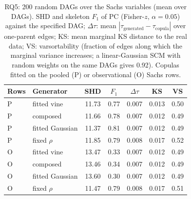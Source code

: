 \documentclass[
  english,
  class=report,
  accentcolor=2c,
  marginpar=false,
  parskip=half-,
  fontsize=11pt,
  ruledheaders=false,
  pdfa=false,
  IMRAD=false,
  thesis={type=master}
]{tudapub}
\begin{document}
\begin{table}[ht]
\caption{RQ5: 200 random DAGs over the Sachs variables (mean over DAGs). SHD and skeleton $F_1$ of PC (Fisher-$z$, $\alpha=0.05$) against the specified DAG; $\Delta\tau$: mean $|\tau_{\text{generated}} - \tau_{\text{copula}}|$ over one-parent edges; KS: mean marginal KS distance to the real data; VS: varsortability (fraction of edges along which the marginal variance increases; a linear-Gaussian SCM with random weights on the same DAGs gives 0.92). Copulas fitted on the pooled (P) or observational (O) Sachs rows.}
\label{tab:novel}
\centering
\small
\begin{tabular}{llccccc}
\toprule
\textbf{Rows} & \textbf{Generator} & \textbf{SHD} & \textbf{$F_1$} & \textbf{$\Delta\tau$} & \textbf{KS} & \textbf{VS} \\
\midrule
P & fitted vine      & 11.73 & 0.77 & 0.007 & 0.013 & 0.50 \\
P & composed         & 11.66 & 0.78 & 0.007 & 0.012 & 0.49 \\
P & fitted Gaussian  & 11.37 & 0.81 & 0.007 & 0.012 & 0.49 \\
P & fixed $\rho$     & 11.85 & 0.79 & 0.008 & 0.017 & 0.52 \\
\addlinespace
O & fitted vine      & 13.47 & 0.33 & 0.007 & 0.012 & 0.49 \\
O & composed         & 13.46 & 0.34 & 0.007 & 0.012 & 0.49 \\
O & fitted Gaussian  & 13.60 & 0.30 & 0.007 & 0.012 & 0.49 \\
O & fixed $\rho$     & 11.47 & 0.79 & 0.008 & 0.017 & 0.51 \\
\bottomrule
\end{tabular}
\end{table}
\end{document}
